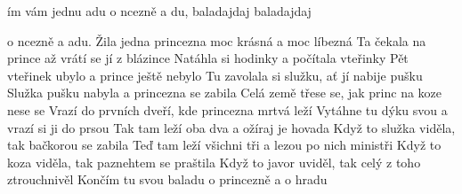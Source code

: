 
\zs
{}ím vám jednu adu o ncezně a du, baladajdaj baladajdaj

o ncezně a adu.
\ks
\zs
Žila jedna princezna moc krásná a moc líbezná
\ks
\zs
Ta čekala na prince až vrátí se jí z blázince
\ks
\zs
Natáhla si hodinky a počítala vteřinky
\ks
\zs
Pět vteřinek ubylo a prince ještě nebylo
\ks
\zs
Tu zavolala si služku, ať jí nabije pušku
\ks
\zs
Služka pušku nabyla a princezna se zabila
\ks
\zs
Celá země třese se, jak princ na koze nese se
\ks
\zs
Vrazí do prvních dveří, kde princezna mrtvá leží
\ks
\zs
Vytáhne tu dýku svou a vrazí si ji do prsou
\ks
\zs
Tak tam leží oba dva a ožíraj je hovada
\ks
\zs
Když to služka viděla, tak bačkorou se zabila
\ks
\zs
Teď tam leží všichni tři a lezou po nich ministři
\ks
\zs
Když to koza viděla, tak paznehtem se praštila
\ks
\zs
Když to javor uviděl, tak celý z toho ztrouchnivěl
\ks
\zs
Končím tu svou baladu o princezně a o hradu
\ks

\kp























